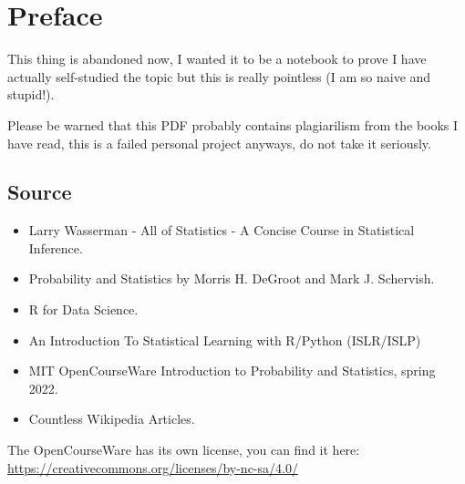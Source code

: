 \chapter*{Preface}
This  thing is abandoned now, I wanted it to be a notebook to prove I have actually self-studied the topic but this is really pointless (I
am so naive and stupid!).

Please be warned that this PDF probably contains plagiarilism from the books I have read, this is a failed personal project anyways, do not
take it seriously.
\section*{Source}
\begin{itemize}
    \item Larry Wasserman - All of Statistics - A Concise Course in Statistical Inference.
    \item Probability and Statistics by Morris H. DeGroot and Mark J. Schervish.
    \item R for Data Science.
    \item An Introduction To Statistical Learning with R/Python (ISLR/ISLP)
    \item MIT OpenCourseWare Introduction to Probability and Statistics, spring 2022.
    \item Countless Wikipedia Articles.
\end{itemize}

The OpenCourseWare has its own license, you can find it here: \url{https://creativecommons.org/licenses/by-nc-sa/4.0/}
